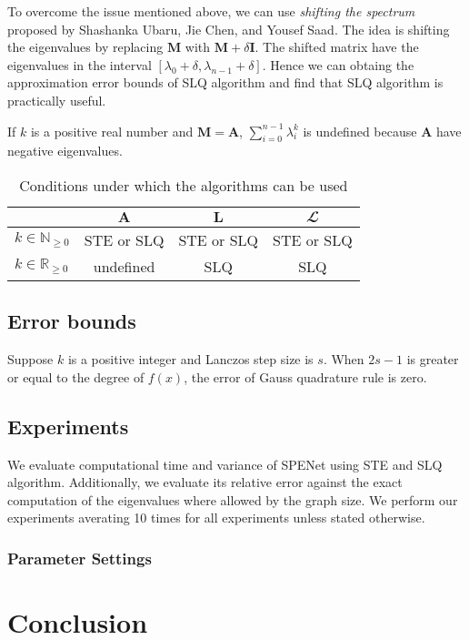 \documentclass[senior,final,11pt]{iscs-thesis}
\begin{document}
To overcome the issue mentioned above, we can use {\it shifting the spectrum} proposed by Shashanka Ubaru, Jie Chen, and Yousef Saad\cite{ubaru2017fast}. The idea is shifting the eigenvalues by replacing ${\mathbf M}$ with ${\mathbf M}+\delta{\mathbf I}$. The shifted matrix have the eigenvalues in the interval $[\lambda_0 + \delta, \lambda_{n-1}+ \delta]$. Hence we can obtaing the approximation error bounds of SLQ algorithm and find that SLQ algorithm is practically useful.

If $k$ is a positive real number and ${\mathbf M}={\mathbf A}$, $\sum_{i=0}^{n-1} \lambda_i^k$ is undefined because ${\mathbf A}$ have negative eigenvalues.

\begin{table}[htb]
    \begin{center}
      \begin{tabular}{l| c c c }
       & ${\mathbf A}$ & ${\mathbf L}$ & ${\mathbfcal L}$ \\ \hline
        $k\in \mathbb{N}_{\geq 0}$ & STE or SLQ  & STE or SLQ  & STE or SLQ \\
        $k\in \mathbb{R}_{\geq 0}$&  undefined  & SLQ  &  SLQ \\
      \end{tabular}
      \caption{Conditions under which the algorithms can be used}
      \label{tab:notion}
    \end{center}
  \end{table}

\section{Error bounds}
Suppose $k$ is a positive integer and Lanczos step size is $s$. When $2s-1$ is greater or equal to the degree of $f(x)$, the error of Gauss quadrature rule is zero.

\section{Experiments}
We evaluate computational time and variance of SPENet using STE and SLQ algorithm. Additionally, we evaluate its relative error against the exact computation of the eigenvalues where allowed by the graph size. We perform our experiments averating 10 times for all experiments unless stated otherwise.

\subsection{Parameter Settings}


\chapter{Conclusion}

\end{document}
